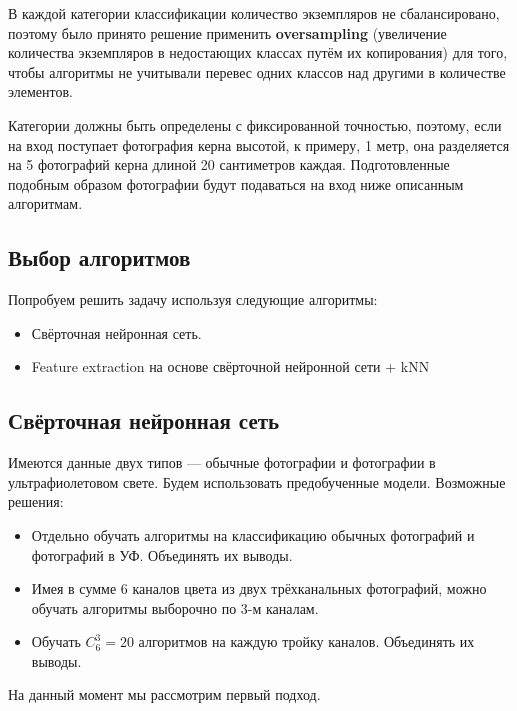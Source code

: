 \documentclass[14pt]{matmex-diploma}
\begin{document}
        В каждой категории классификации количество экземпляров не сбалансировано, поэтому было принято решение применить \textbf{oversampling} (увеличение количества экземпляров в недостающих классах путём их копирования) для того, чтобы алгоритмы не учитывали перевес одних классов над другими в количестве элементов.
        
        Категории должны быть определены с фиксированной точностью, поэтому, если на вход поступает фотография керна высотой, к примеру, 1 метр, она разделяется на 5 фотографий керна длиной 20 сантиметров каждая. Подготовленные подобным образом фотографии будут подаваться на вход ниже описанным алгоритмам.

    \subsection{Выбор алгоритмов}
    
        Попробуем решить задачу используя следующие алгоритмы:
        
        \begin{itemize}
            \item Свёрточная нейронная сеть.
            \item Feature extraction на основе свёрточной нейронной сети + kNN
        \end{itemize}
    
    \subsection{Свёрточная нейронная сеть}
    
        Имеются данные двух типов — обычные фотографии и фотографии в ультрафиолетовом свете. Будем использовать предобученные модели. Возможные решения:
        
        \begin{itemize}
            \item Отдельно обучать алгоритмы на классификацию обычных фотографий и фотографий в УФ. Объединять их выводы.
            \item Имея в сумме 6 каналов цвета из двух трёхканальных фотографий, можно обучать алгоритмы выборочно по 3-м каналам.
            \item Обучать $C_{6}^{3}=20$ алгоритмов на каждую тройку каналов. Объединять их выводы.
        \end{itemize}         
    
        На данный момент мы рассмотрим первый подход.    
    
\end{document}

